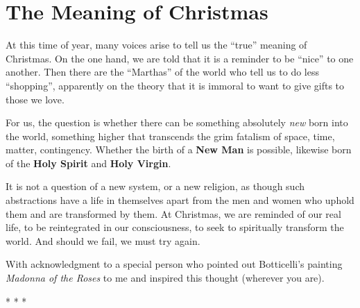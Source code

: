 \section{The Meaning of Christmas}

At this time of year, many voices arise to tell us the ``true'' meaning of Christmas. On the one hand, we are told that it is a reminder to be ``nice'' to one another. Then there are the ``Marthas'' of the world who tell us to do less ``shopping'', apparently on the theory that it is immoral to want to give gifts to those we love.

For us, the question is whether there can be something absolutely \emph{new} born into the world, something higher that transcends the grim fatalism of space, time, matter, contingency. Whether the birth of a \textbf{New Man} is possible, likewise born of the \textbf{Holy Spirit} and \textbf{Holy Virgin}.

It is not a question of a new system, or a new religion, as though such abstractions have a life in themselves apart from the men and women who uphold them and are transformed by them. At Christmas, we are reminded of our real life, to be reintegrated in our consciousness, to seek to spiritually transform the world. And should we fail, we must try again.

With acknowledgment to a special person who pointed out Botticelli's painting \textit{Madonna of the Roses} to me and inspired this thought (wherever you are).



\begin{center}* * *\end{center}

